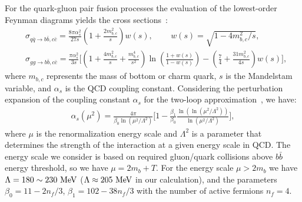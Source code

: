 For the quark-gluon pair fusion processes
the evaluation of the lowest-order Feynman diagrams yields the cross sections~\cite{Letessier:2002ony}:
\begin{align}
&\sigma_{q\bar{q}\rightarrow b\bar{b},c\bar{c}}=\frac{8\pi\alpha_s^2}{27s}\left(1+\frac{2m_{b,c}^2}{s}\right)w(s),\,\qquad w(s)=\sqrt{1-{4m^2_{b,c}}/{s}},\\
&\sigma_{gg\rightarrow b\bar{b},c\bar{c}}=\!\frac{\pi\alpha_s^2}{3s}\bigg[\left(1\!+\!\frac{4m^2_{b,c}}{s}\!+\!\frac{m^4_{b,c}}{s^2}\right)\ln{\left(\frac{1+w(s)}{1-w(s)}\right)}\!-\!\left(\frac{7}{4}\!+\!\frac{31m^2_{b,c}}{4s}\right)w(s)\bigg],
\end{align} 
where $m_{b,c}$ represents the mass of bottom or charm quark, $s$ is the Mandelstam variable, and $\alpha_s$ is the QCD coupling constant. Considering the perturbation expansion of the coupling constant $\alpha_s$ for the two-loop approximation~\cite{Letessier:2002ony}, we have:
\begin{align}
\alpha_s(\mu^2)=\frac{4\pi}{\beta_0\ln({\mu^2/\Lambda^2})}\bigg[1-\frac{\beta_1}{\beta_0}\frac{\ln(\ln{(\mu^2/\Lambda^2)})}{\ln(\mu^2/\Lambda^2)}\bigg],
\end{align}
where $\mu$ is the renormalization energy scale and $\Lambda^2$ is a parameter that determines the strength of the interaction at a given energy scale in QCD. The energy scale we consider is based on required gluon/quark collisions above $b\bar b$ energy threshold, so we have $\mu=2m_b+T$. For the energy scale $\mu>2m_b$ we have $\Lambda=180\sim230\text{ MeV}$ ($\Lambda\approx205\text{ MeV}$ in our calculation), and the parameters $\beta_0=11-2n_f/3$, $\beta_1=102-38n_f/3$ with the number of active fermions $n_f=4$. 

